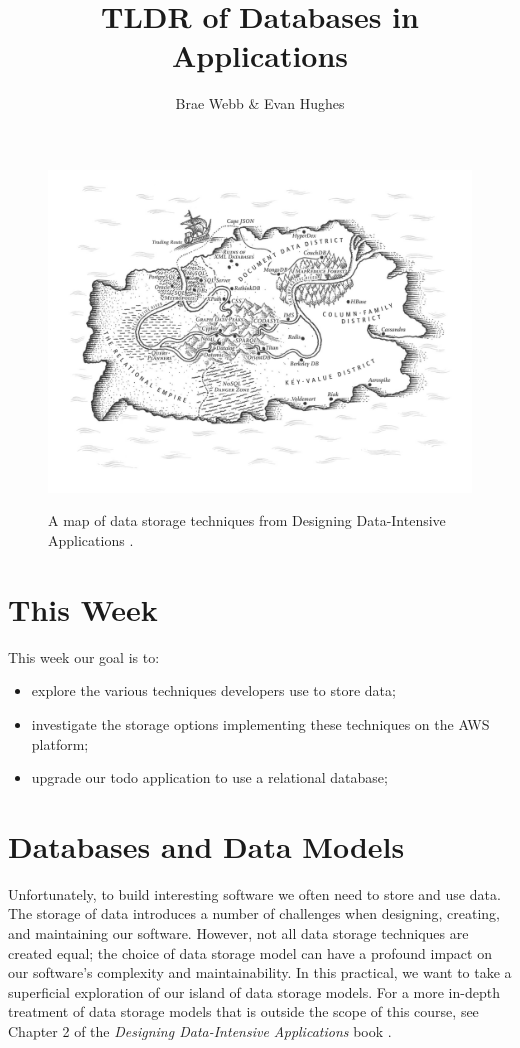 \documentclass{csse4400}
\title{TLDR of Databases in Applications}
\author{Brae Webb \& Evan Hughes}
\date{\week{2}}
\begin{document}
\maketitle

\begin{figure}[h]
  \href{https://www.oreilly.com/library/view/designing-data-intensive-applications/9781491903063/ch02.html}{
    \includegraphics[width=\textwidth]{images/databases}
  }
\caption{A map of data storage techniques from Designing Data-Intensive Applications \cite{data-intensive}.}
\end{figure}

\section{This Week}
This week our goal is to:
\begin{itemize}
  \item explore the various techniques developers use to store data;
  \item investigate the storage options implementing these techniques on the AWS platform;
  \item upgrade our todo application to use a relational database;
\end{itemize}

\section{Databases and Data Models}
Unfortunately, to build interesting software we often need to store and use data.
The storage of data introduces a number of challenges when designing, creating, and maintaining our software.
However, not all data storage techniques are created equal;
the choice of data storage model can have a profound impact on our software's complexity and maintainability.
In this practical, we want to take a superficial exploration of our island of data storage models.
For a more in-depth treatment of data storage models that is outside the scope of this course,
see Chapter 2 of the \textit{Designing Data-Intensive Applications} book \cite{data-intensive}.
\end{document}
